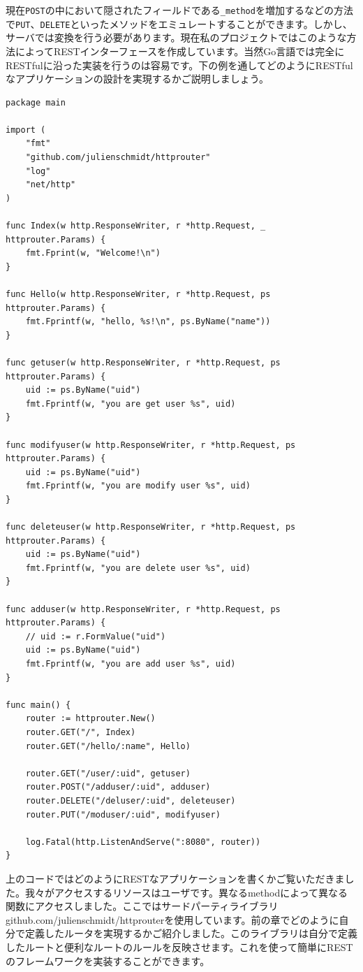現在\texttt{POST}の中において隠されたフィールドである\texttt{\_method}を増加するなどの方法で\texttt{PUT}、\texttt{DELETE}といったメソッドをエミュレートすることができます。しかし、サーバでは変換を行う必要があります。現在私のプロジェクトではこのような方法によってRESTインターフェースを作成しています。当然Go言語では完全にRESTfulに沿った実装を行うのは容易です。下の例を通してどのようにRESTfulなアプリケーションの設計を実現するかご説明しましょう。

\begin{lstlisting}[numbers=none]
package main

import (
    "fmt"
    "github.com/julienschmidt/httprouter"
    "log"
    "net/http"
)

func Index(w http.ResponseWriter, r *http.Request, _ httprouter.Params) {
    fmt.Fprint(w, "Welcome!\n")
}

func Hello(w http.ResponseWriter, r *http.Request, ps httprouter.Params) {
    fmt.Fprintf(w, "hello, %s!\n", ps.ByName("name"))
}

func getuser(w http.ResponseWriter, r *http.Request, ps httprouter.Params) {
    uid := ps.ByName("uid")
    fmt.Fprintf(w, "you are get user %s", uid)
}

func modifyuser(w http.ResponseWriter, r *http.Request, ps httprouter.Params) {
    uid := ps.ByName("uid")
    fmt.Fprintf(w, "you are modify user %s", uid)
}

func deleteuser(w http.ResponseWriter, r *http.Request, ps httprouter.Params) {
    uid := ps.ByName("uid")
    fmt.Fprintf(w, "you are delete user %s", uid)
}

func adduser(w http.ResponseWriter, r *http.Request, ps httprouter.Params) {
    // uid := r.FormValue("uid")
    uid := ps.ByName("uid")
    fmt.Fprintf(w, "you are add user %s", uid)
}

func main() {
    router := httprouter.New()
    router.GET("/", Index)
    router.GET("/hello/:name", Hello)

    router.GET("/user/:uid", getuser)
    router.POST("/adduser/:uid", adduser)
    router.DELETE("/deluser/:uid", deleteuser)
    router.PUT("/moduser/:uid", modifyuser)

    log.Fatal(http.ListenAndServe(":8080", router))
}
\end{lstlisting}

上のコードではどのようにRESTなアプリケーションを書くかご覧いただきました。我々がアクセスするリソースはユーザです。異なるmethodによって異なる関数にアクセスしました。ここではサードパーティライブラリgithub.com/julienschmidt/httprouterを使用しています。前の章でどのように自分で定義したルータを実現するかご紹介しました。このライブラリは自分で定義したルートと便利なルートのルールを反映させます。これを使って簡単にRESTのフレームワークを実装することができます。
